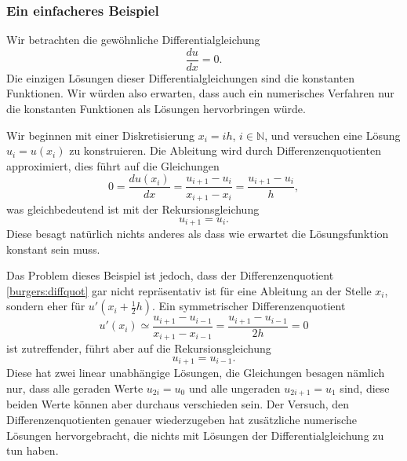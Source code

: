 \subsubsection{Ein einfacheres Beispiel}
Wir betrachten die gewöhnliche Differentialgleichung
\begin{equation}
\frac{du}{dx}=0.
\label{burgers:konstant}
\end{equation}
Die einzigen Lösungen dieser Differentialgleichungen sind die konstanten
Funktionen.
Wir würden also erwarten, dass auch ein numerisches Verfahren nur
die konstanten Funktionen als Lösungen hervorbringen würde.

Wir beginnen mit einer Diskretisierung $x_i=ih$, $i\in\mathbb N$, und
versuchen eine Lösung $u_i= u(x_i)$ zu konstruieren.
Die Ableitung wird durch Differenzenquotienten approximiert, dies
führt auf die Gleichungen
\begin{equation}
0
=
\frac{du(x_i)}{dx}
=
\frac{u_{i+1}-u_{i}}{x_{i+1}-x_{i}} = \frac{u_{i+1}-u_i}{h},
\label{burgers:diffquot}
\end{equation}
was gleichbedeutend ist mit der Rekursionsgleichung
\[
u_{i+1} = u_{i}.
\]
Diese besagt natürlich nichts anderes als dass wie erwartet
die Lösungsfunktion konstant sein muss.

Das Problem dieses Beispiel ist jedoch, dass der Differenzenquotient
\eqref{burgers:diffquot} gar nicht repräsentativ ist für eine Ableitung
an der Stelle $x_i$, sondern eher für $u'(x_i+\frac12h)$.
Ein symmetrischer Differenzenquotient 
\[
u'(x_i)
\simeq
\frac{u_{i+1}-u_{i-1}}{x_{i+1}-x_{i-1}}=\frac{u_{i+1}-u_{i-1}}{2h}=0
\]
ist zutreffender, führt aber auf die Rekursionsgleichung
\[
u_{i+1}=u_{i-1}.
\]
Diese hat zwei linear unabhängige Lösungen, die Gleichungen besagen
nämlich nur, dass alle geraden Werte $u_{2i}=u_0$ und alle ungeraden
$u_{2i+1}=u_1$ sind, diese beiden Werte können aber durchaus verschieden
sein.
Der Versuch, den Differenzenquotienten genauer wiederzugeben hat 
zusätzliche numerische Lösungen hervorgebracht, die nichts mit Lösungen
der Differentialgleichung zu tun haben.


